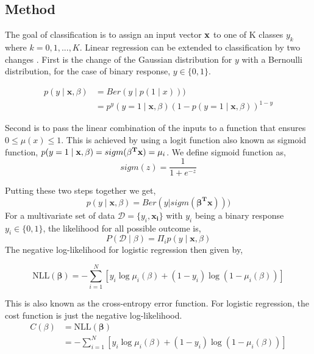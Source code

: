 \subsection{Method} \label{subsec:method_logistic_regression}

The goal of classification is to assign an input vector $\bold{x}$ to one of K classes $y_k$ where $k=0,1,...,K$. Linear regression can be extended to classification by two changes \cite{murphy_machine_2012}. First is the change of the Gaussian distribution for $y$ with a Bernoulli distribution, for the case of binary response, $y \in \{0,1\}$. 

\begin{align}
     p(y \mid \mathbf{x}, \beta)&=Ber(y \mid p(1\mid x))) \\
        &= p^{y}\left(y=1\mid  \mathbf{x}, \beta \right)\left(1-p(y=1\mid  \mathbf{x}, \beta )\right)^{1-y}
\end{align}

Second is to pass the linear combination of the inputs to a function that ensures $0 \leq \mu(x)\leq 1$. This is achieved by using a logit function also known as sigmoid function, $p(y=1\mid \bold{x}, \bold{\beta}) = sigm(\mathbf{\bold{\beta}^T \bold{x}})=\mu_i$. 
\newline\newline
We define sigmoid function as,
\begin{equation}
    sigm(z ) = \frac{1}{1 + e^{-z}}
\end{equation}


Putting these two steps together we get,
\begin{equation}\label{eq:likelihood}
    p(y \mid \mathbf{x}, \beta)=Ber(y|sigm(\mathbf{\beta^T x})))
\end{equation}
For a multivariate set of data $\mathcal{D} = \{y_i, \mathbf{x_i}\}$ with $y_i$ being a binary response $y_i \in \{0,1\}$, the likelihood for all possible outcome is, 
\begin{equation}
    P(\mathcal{D}\mid \beta) =  \Pi_i p(y \mid \mathbf{x}, \beta)
\end{equation}
The negative log-likelihood for logistic regression then given by,


\begin{equation}
  \mathrm{NLL}(\mathbf{\mathbf{\beta}}) =-\sum_{i=1}^{N}\left[y_{i} \log \mu_{i}(\beta)+\left(1-y_{i}\right) \log \left(1-\mu_{i}(\beta)\right)\right]
\end{equation}

This is also known as the cross-entropy error function. For logistic regression, the cost function is just the negative log-likelihood. 
\begin{align}
      C(\beta) &= \mathrm{NLL}(\mathbf{\mathbf{\beta}})\\
             &=-\sum_{i=1}^{N}\left[y_{i} \log \mu_{i}(\beta)+\left(1-y_{i}\right) \log \left(1-\mu_{i}(\beta)\right)\right]
\end{align}

